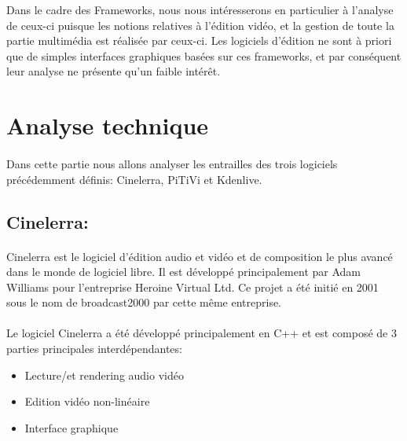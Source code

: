 Dans le cadre des Frameworks, nous nous intéresserons
en particulier à l'analyse de ceux-ci puisque les notions relatives
à l'édition vidéo, et la gestion de toute la partie multimédia est
réalisée par ceux-ci. Les logiciels d'édition ne sont à priori que
de simples interfaces graphiques basées sur ces frameworks, et par
conséquent leur analyse ne présente qu'un faible intérêt.

\newpage \section{Analyse technique}

\paragraph {}

Dans cette partie nous allons analyser les entrailles des trois logiciels précédemment
définis: Cinelerra, PiTiVi et Kdenlive.

\subsection{Cinelerra:}

\paragraph {}

Cinelerra est le logiciel d'édition audio et vidéo et de composition le plus
avancé dans le monde de logiciel libre. Il est développé principalement par
Adam Williams pour l'entreprise Heroine Virtual Ltd. Ce projet a été initié
en 2001 sous le nom de broadcast2000 par cette même entreprise.

\paragraph{}

Le logiciel Cinelerra a été développé principalement en C++ et est composé de 3 parties
principales interdépendantes:

\begin{itemize}

  \item{Lecture/et rendering audio vidéo}

  \item{Edition vidéo non-linéaire}

  \item{Interface graphique}

\end{itemize}

